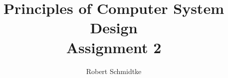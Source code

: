 \documentclass[a4paper,11pt]{article}
\title{Principles of Computer System Design\\Assignment 2}
\author{Robert Schmidtke}
\begin{document}
\maketitle

\section{}
\end{document}
